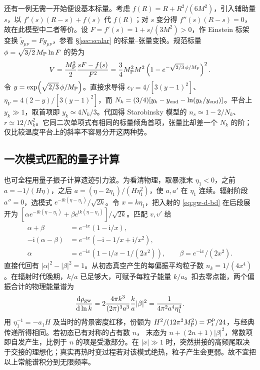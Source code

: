 还有一例无需一开始便设基本标量。考虑 $f(R)=R+R^2/(6M^2)$，引入辅助量 $s$，以 $f'(s)(R-s)+f(s)$ 代 $f(R)$；对 $s$ 变分得 $f''(s)(R-s)=0$，故在此模型中二者等价。设 $F=f'(s)=1+s/(3M^2)>0$，作 Einstein 标架变换 $\widetilde g_{\mu\nu}=F g_{\mu\nu}$，参看 \S\ref{sec:scalar} 的标量--张量变换。规范标量 $\phi=\sqrt{3/2}\,M_{\rm P}\ln F$ 的势为
\[
 V=\frac{M_{\rm P}^2}{2}\frac{sF-f(s)}{F^2}
   =\frac34 M_{\rm P}^2M^2
   \left(1-e^{-\sqrt{2/3}\,\phi/M_{\rm P}}\right)^2 .
\]
令 $y=\exp(\sqrt{2/3}\,\phi/M_{\rm P})$。直接求导得 $\epsilon_V=4/[3(y-1)^2]$、$\eta_V=4(2-y)/[3(y-1)^2]$，而 $N_k=(3/4)[y_k-y_{\rm end}-\ln(y_k/y_{\rm end})]$。平台上 $y_k\gg1$，取首项即 $y_k\simeq4N_k/3$。代回得 Starobinsky 模型的 $n_s\simeq1-2/N_k$、$r\simeq12/N_k^2$。它同二次单项式有相同的标量倾角首项，张量比却差一个 $N_k$ 的阶；仅比较温度平台上的斜率不容易分开这两种势。

\subsection{一次模式匹配的量子计算}

也可全程用量子振子计算遗迹引力波。为看清物理，取暴涨末 $\eta_1<0$，之前 $a=-1/(H\eta)$，之后 $a=(\eta-2\eta_1)/(H\eta_1^2)$，使 $a,a'$ 在 $\eta_1$ 连续。辐射阶段 $a''=0$，选模式 $e^{-\mathrm i k(\eta-\eta_1)}/\sqrt{2k}$。令 $x=k\eta_1$，把入射的 \eqref{eq:gw-d-bd} 在后段展开为 $[\alpha e^{-\mathrm i k(\eta-\eta_1)}+\beta e^{\mathrm i k(\eta-\eta_1)}]/\sqrt{2k}$。匹配 $v,v'$ 给
\begin{align*}
 \alpha+\beta&=e^{-\mathrm i x}(1-\mathrm i/x),\\
 -\mathrm i(\alpha-\beta)&=e^{-\mathrm i x}(-\mathrm i-1/x+\mathrm i/x^2),\\
 \alpha&=e^{-\mathrm i x}(1-\mathrm i/x-1/(2x^2)),\qquad
 \beta=e^{-\mathrm i x}/(2x^2).
\end{align*}
直接代回有 $|\alpha|^2-|\beta|^2=1$。从初态真空产生的每偏振平均粒子数 $n_k=1/(4x^4)$。在辐射时代晚期，$k/a$ 已足够大，可赋予每粒子能量 $k/a$。扣去零点能，两个偏振合计的物理能量谱为
\[
 \frac{\mathrm d\rho_{\rm gw}}{\mathrm d\ln k}
 =2\frac{4\pi k^3}{(2\pi)^3a^3}\frac{k}{a}|\beta|^2
 =\frac{1}{4\pi^2a^4\eta_1^4}.
\]
用 $\eta_1^{-1}=-a_1H$ 及当时的背景密度红移，份额为 $H^2/(12\pi^2M_{\rm P}^2)=\mathcal P_t^{\rm p}/24$，与经典传递所得相同。若初态已有对称的占有数 $n$， 末态为 $n+(2n+1)|\beta|^2$，常数项即自发产生，比例于 $n$ 的项是受激部分。在 $|x|\gg1$ 时，突然拼接的高频尾取决于交接的理想化；真实再热时变过程若对该模式绝热，粒子产生会更弱。故不宜把以上常能谱积分到无限频率。

